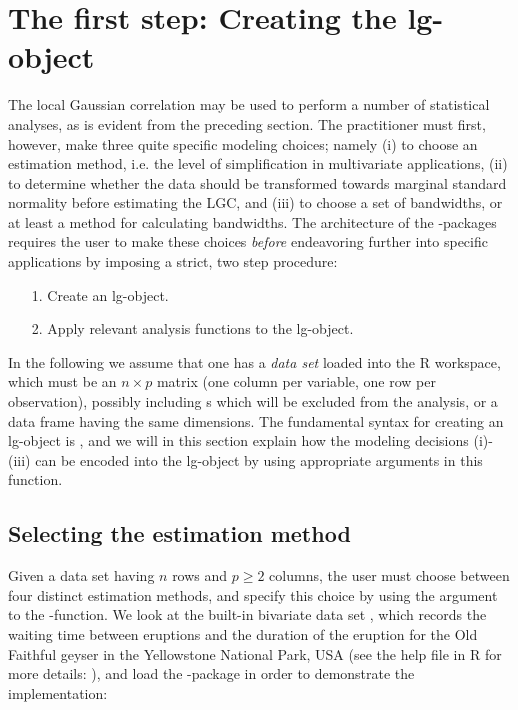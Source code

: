 \section{The first step: Creating the lg-object} 
\label{chap:lgobject}

The local Gaussian correlation may be used to perform a number of statistical analyses, as is evident from the preceding section. The practitioner must first, however, make three quite specific modeling choices; namely (i) to choose an estimation method, i.e. the level of simplification in multivariate applications, (ii) to determine whether the data should be transformed towards marginal standard normality before estimating the LGC, and (iii) to choose a set of bandwidths, or at least a method for calculating bandwidths. The architecture of the -packages requires the user to make these choices \emph{before} endeavoring further into specific applications by imposing a strict, two step procedure:

\begin{itemize}
\item[1.] Create an lg-object.
\item[2.] Apply relevant analysis functions to the lg-object.
\end{itemize}

In the following we assume that one has a \emph{data set}  loaded into the R workspace, which must be an $n\times p$ matrix (one column per variable, one row per observation), possibly including s which will be excluded from the analysis, or a data frame having the same dimensions. The fundamental syntax for creating an lg-object is , and we will in this section explain how the modeling decisions (i)-(iii) can be encoded into the lg-object by using appropriate arguments in this function.

\subsection{Selecting the estimation method}
\label{chap:est-method}

Given a data set  having $n$ rows and $p \geq 2$ columns, the user must choose between four distinct estimation methods, and specify this choice by using the argument  to the -function. We look at the built-in bivariate data set , which records the waiting time between eruptions and the duration of the eruption for the Old Faithful geyser in the Yellowstone National Park, USA (see the help file in R for more details: ), and load the -package in order to demonstrate the implementation:

